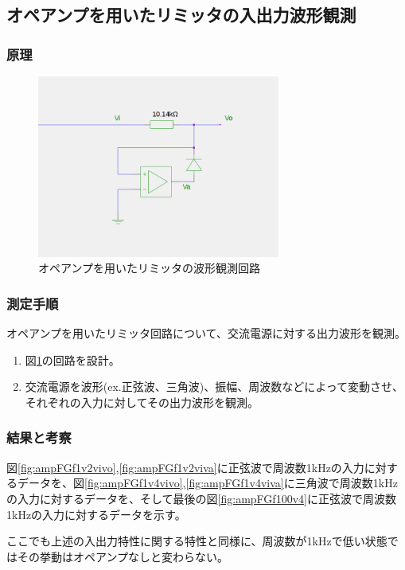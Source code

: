 \documentclass[11pt,a4j]{jsarticle}
\begin{document}
    
  \subsection{オペアンプを用いたリミッタの入出力波形観測}
   \subsubsection{原理}
    
    \begin{figure}[htbp]
  \centering
  \includegraphics[width=8cm,clip]{amp_wave.png}
  \caption{オペアンプを用いたリミッタの波形観測回路}
  \label{fig:amp_wave}
 \end{figure}%
    
   \subsubsection{測定手順}
    オペアンプを用いたリミッタ回路について、交流電源に対する出力波形を観測。
    \begin{enumerate}
    \item 図\ref{fig:amp_wave}の回路を設計。
    \item 交流電源を波形(ex.正弦波、三角波)、振幅、周波数などによって変動させ、それぞれの入力に対してその出力波形を観測。
    \end{enumerate}
    
   \subsubsection{結果と考察}
    図\ref{fig:ampFGf1v2vivo},\ref{fig:ampFGf1v2viva}に正弦波で周波数1kHzの入力に対するデータを、図\ref{fig:ampFGf1v4vivo},\ref{fig:ampFGf1v4viva}に三角波で周波数1kHzの入力に対するデータを、そして最後の図\ref{fig:ampFGf100v4}に正弦波で周波数1kHzの入力に対するデータを示す。
    
    ここでも上述の入出力特性に関する特性と同様に、周波数が1kHzで低い状態ではその挙動はオペアンプなしと変わらない。
    
\end{document}
